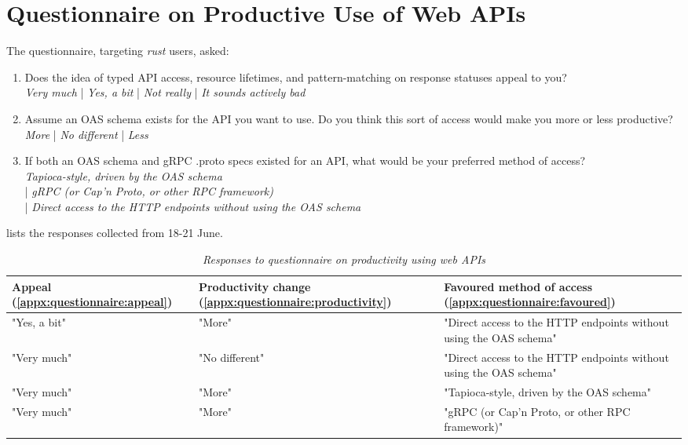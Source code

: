 \section{Questionnaire on Productive Use of Web APIs} \label{appx:questionnaire}

The questionnaire, targeting \emph{rust} users, asked:~\cite{questionnaire}
\begin{enumerate}[a]
    \item\label{appx:questionnaire:appeal}
    Does the idea of typed API access, resource lifetimes, and pattern-matching on response statuses appeal to you?
    \\ \emph{Very much} | \emph{Yes, a bit} | \emph{Not really} | \emph{It sounds actively bad}
    \item\label{appx:questionnaire:productivity}
    Assume an OAS schema exists for the API you want to use. Do you think this sort of access would make you more or less productive? \\ \emph{More} | \emph{No different} | \emph{Less}
    \item\label{appx:questionnaire:favoured} If both an OAS schema and gRPC .proto specs existed for an API, what would be your preferred method of access?
    \\ \emph{Tapioca-style, driven by the OAS schema}
    \\| \emph{gRPC (or Cap'n Proto, or other RPC framework)}
    \\| \emph{Direct access to the HTTP endpoints without using the OAS schema}
\end{enumerate}

 lists the responses collected from 18-21 June.

\begin{spacing}{\tblspacing}
\centering
\begin{table}[!ht]
\caption{\emph{Responses to questionnaire on productivity using web APIs}}
\label{tbl:appx:questionnaire}
\centering
\begin{tabular}{p{2cm}|p{3cm}|p{6cm}}%
    \toprule
    \textbf{Appeal} (\cref{appx:questionnaire:appeal}) & \textbf{Productivity change} (\cref{appx:questionnaire:productivity}) & \textbf{Favoured method of access} (\cref{appx:questionnaire:favoured})
    \\\midrule
    "Yes, a bit" & "More" & "Direct access to the HTTP endpoints without using the OAS schema"
    \\\cmidrule(lr){1-3}
    "Very much" & "No different" & "Direct access to the HTTP endpoints without using the OAS schema"
    \\\cmidrule(lr){1-3}
    "Very much" & "More" & "Tapioca-style, driven by the OAS schema"
    \\\cmidrule(lr){1-3}
    "Very much" & "More" & "gRPC (or Cap'n Proto, or other RPC framework)"
    \\\bottomrule
\end{tabular}
\end{table}
\end{spacing}

